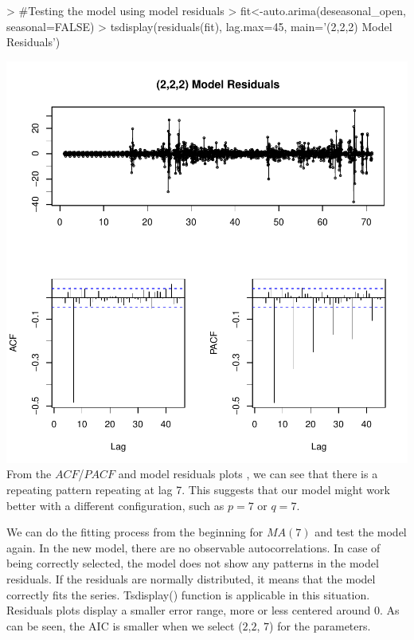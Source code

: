 \documentclass{article}
\begin{document}
\begin{Schunk}
\begin{Sinput}
> #Testing the model using model residuals
> fit<-auto.arima(deseasonal_open, seasonal=FALSE)
> tsdisplay(residuals(fit), lag.max=45, main='(2,2,2) Model Residuals')
\end{Sinput}
\end{Schunk}
\includegraphics{Report-021}
From the $ACF$/$PACF$ and model residuals plots , we can see that there is a repeating pattern repeating at lag 7. This suggests that our model might work better with a different configuration, such as $p = 7$ or $q = 7$. 

We can do the fitting process from the beginning for $MA(7)$ and test the model again. In the new model, there are no observable autocorrelations. In case of being correctly selected, the model does not show any patterns in the model residuals. If the residuals are normally distributed, it means that the model correctly fits the series. Tsdisplay() function is applicable in this situation. Residuals plots display a smaller error range, more or less centered around 0. As can be seen, the AIC is smaller when we select ($2$,$2$, $7$) for the parameters.
\end{document}
